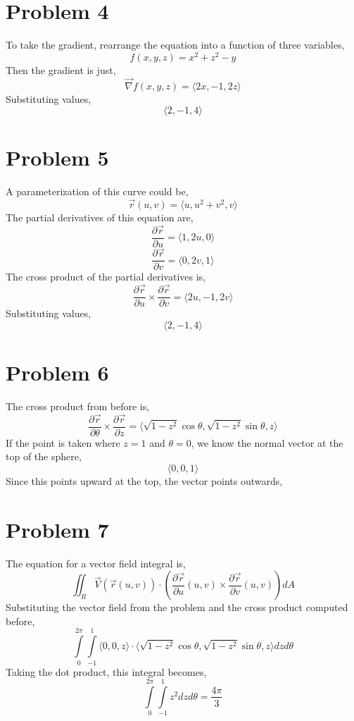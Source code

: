 \documentclass{article}
\begin{document}
\section*{Problem 4}

To take the gradient, rearrange the equation into a function of three variables,
$$ f(x,y,z) = x^2 +z^2 - y $$
Then the gradient is just,
$$ \vec{\nabla}f(x, y, z) = \langle 2x, -1, 2z \rangle $$
Substituting values,
$$ \langle 2, -1, 4 \rangle $$

\section*{Problem 5}

A parameterization of this curve could be,
$$ \vec{r}(u, v) = \langle u, u^2 + v^2, v \rangle $$
The partial derivatives of this equation are,
$$ \frac{\partial \vec{r}}{\partial u} = \langle 1, 2u, 0 \rangle $$
$$ \frac{\partial \vec{r}}{\partial v} = \langle 0, 2v, 1 \rangle $$
The cross product of the partial derivatives is,
$$ \frac{\partial \vec{r}}{\partial u} \times \frac{\partial \vec{r}}{\partial
v}  = \langle 2u, -1, 2v \rangle $$
Substituting values,
$$ \langle 2, -1, 4 \rangle $$

\section*{Problem 6}

The cross product from before is,
$$ \frac{\partial \vec{r}}{\partial \theta} \times \frac{\partial
\vec{r}}{\partial z} = \langle \sqrt{1 - z^2} \cos \theta, \sqrt{1 - z^2} \sin
\theta, z \rangle $$
If the point is taken where $z = 1$ and $\theta = 0$, we know the normal vector
at the top of the sphere,
$$ \langle 0, 0, 1 \rangle $$
Since this points upward at the top, the vector points outwards,

\section*{Problem 7}

The equation for a vector field integral is,
$$ \iint_R \vec{V}(\vec{r}(u, v)) \cdot \left(\frac{\partial \vec{r}}{\partial
u}(u, v) \times \frac{\partial \vec{r}}{\partial v}(u, v) \right) dA $$
Substituting the vector field from the problem and the cross product computed
before,
$$ \int\limits_0^{2\pi}\int\limits_{-1}^1 \langle 0, 0, z \rangle \cdot \langle
\sqrt{1 - z^2} \cos \theta, \sqrt{1 - z^2} \sin \theta, z \rangle dz d\theta $$
Taking the dot product, this integral becomes,
$$ \int\limits_0^{2\pi}\int\limits_{-1}^1 z^2 dz d\theta = \frac{4\pi}{3} $$
\end{document}
